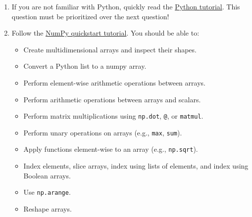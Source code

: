 \documentclass[a4paper,11pt]{article}
\begin{document}
\begin{enumerate}
 \item If you are not familiar with Python, quickly read the \href{https://docs.python.org/3/tutorial/}{Python tutorial}.
This question must be prioritized over the next question!
 \item Follow the \href{https://docs.scipy.org/doc/numpy/user/quickstart.html}{NumPy quickstart tutorial}. You should be able to:
 \begin{itemize}
  \item Create multidimensional arrays and inspect their shapes.
  \item Convert a Python list to a numpy array.
  \item Perform element-wise arithmetic operations between arrays.
  \item Perform arithmetic operations between arrays and scalars.
  \item Perform matrix multiplications using \texttt{np.dot},  \texttt{@}, or \texttt{matmul}.
  \item Perform unary operations on arrays (e.g., \texttt{max}, \texttt{sum}).
  \item Apply functions element-wise to an array (e.g., \texttt{np.sqrt}).
  \item Index elements, slice arrays, index using lists of elements, and index using Boolean arrays.
  \item Use \texttt{np.arange}.
  \item Reshape arrays. 
 \end{itemize}


\end{enumerate}
\end{document}
